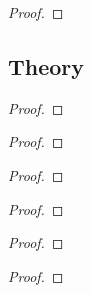 \begin{exercise}
\end{exercise}

\begin{proof}
\end{proof}

\subsection*{Theory}

\begin{exercise}
\end{exercise}

\begin{proof}
\end{proof}

\begin{exercise}
\end{exercise}

\begin{proof}
\end{proof}

\begin{exercise}
\end{exercise}

\begin{proof}
\end{proof}

\begin{exercise}
\end{exercise}

\begin{proof}
\end{proof}

\begin{exercise}
\end{exercise}

\begin{proof}
\end{proof}

\begin{exercise}
\end{exercise}

\begin{proof}
\end{proof}

\begin{exercise}
\end{exercise}


